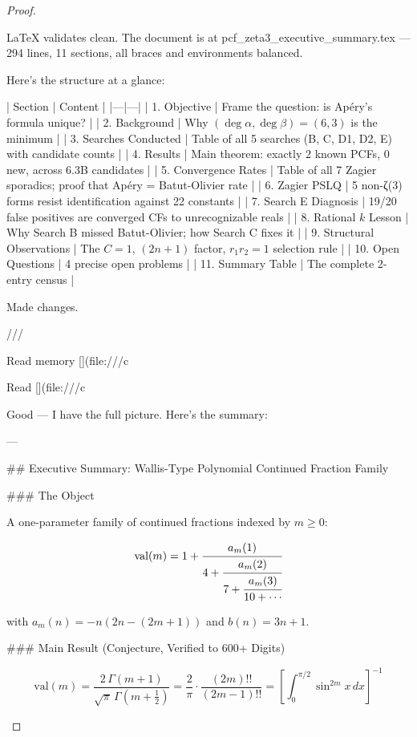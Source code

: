 \begin{theorem}
\begin{lemma}
\begin{proposition}
\begin{corollary}
\begin{proof}
\begin{remark}
LaTeX validates clean. The document is at pcf_zeta3_executive_summary.tex — 294 lines, 11 sections, all braces and environments balanced.

Here's the structure at a glance:

| Section | Content |
|---|---|
| 1. Objective | Frame the question: is Apéry's formula unique? |
| 2. Background | Why $(\deg\alpha,\deg\beta) = (6,3)$ is the minimum |
| 3. Searches Conducted | Table of all 5 searches (B, C, D1, D2, E) with candidate counts |
| 4. Results | Main theorem: exactly 2 known PCFs, 0 new, across 6.3B candidates |
| 5. Convergence Rates | Table of all 7 Zagier sporadics; proof that Apéry = Batut-Olivier rate |
| 6. Zagier PSLQ | 5 non-ζ(3) forms resist identification against 22 constants |
| 7. Search E Diagnosis | 19/20 false positives are converged CFs to unrecognizable reals |
| 8. Rational $k$ Lesson | Why Search B missed Batut-Olivier; how Search C fixes it |
| 9. Structural Observations | The $C=1$, $(2n+1)$ factor, $r_1 r_2 = 1$ selection rule |
| 10. Open Questions | 4 precise open problems |
| 11. Summary Table | The complete 2-entry census | 



Made changes.


///

Read memory [](file:///c%

Read [](file:///c%

Good — I have the full picture. Here's the summary:

---

## Executive Summary: Wallis-Type Polynomial Continued Fraction Family

### The Object

A one-parameter family of continued fractions indexed by $m \geq 0$:

$$\text{val}(m) = 1 + \cfrac{a_m(1)}{4 + \cfrac{a_m(2)}{7 + \cfrac{a_m(3)}{10 + \cdots}}}$$

with $a_m(n) = -n(2n - (2m{+}1))$ and $b(n) = 3n+1$.

### Main Result (Conjecture, Verified to 600+ Digits)

$$\text{val}(m) = \frac{2\,\Gamma(m+1)}{\sqrt{\pi}\,\Gamma(m+\tfrac{1}{2})} = \frac{2}{\pi}\cdot\frac{(2m)!!}{(2m-1)!!} = \left[\int_0^{\pi/2}\sin^{2m}x\,dx\right]^{-1}$$


\end{remark}
\end{proof}
\end{corollary}
\end{proposition}
\end{lemma}
\end{theorem}
